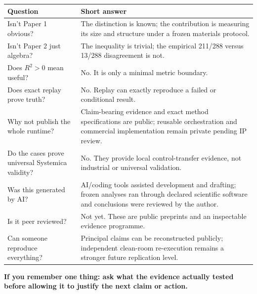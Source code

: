 \documentclass[11pt,a4paper]{article}
\begin{document}
\begin{tabularx}{\textwidth}{p{}p{}}
\toprule Question & Short answer\\\midrule
Isn't Paper 1 obvious? & The distinction is known; the contribution is measuring its size and structure under a frozen materials protocol.\\
Isn't Paper 2 just algebra? & The inequality is trivial; the empirical 211/288 versus 13/288 disagreement is not.\\
Does $R^2>0$ mean useful? & No. It is only a minimal metric boundary.\\
Does exact replay prove truth? & No. Replay can exactly reproduce a failed or conditional result.\\
Why not publish the whole runtime? & Claim-bearing evidence and exact method specifications are public; reusable orchestration and commercial implementation remain private pending IP review.\\
Do the cases prove universal Systemica validity? & No. They provide local control-transfer evidence, not industrial or universal validation.\\
Was this generated by AI? & AI/coding tools assisted development and drafting; frozen analyses ran through declared scientific software and conclusions were reviewed by the author.\\
Is it peer reviewed? & Not yet. These are public preprints and an inspectable evidence programme.\\
Can someone reproduce everything? & Principal claims can be reconstructed publicly; independent clean-room re-execution remains a stronger future replication level.\\
\bottomrule\end{tabularx}

\vspace{2mm}
\begin{center}{\large\bfseries\color{ink} If you remember one thing: ask what the evidence actually tested before allowing it to justify the next claim or action.}\end{center}
\end{document}
